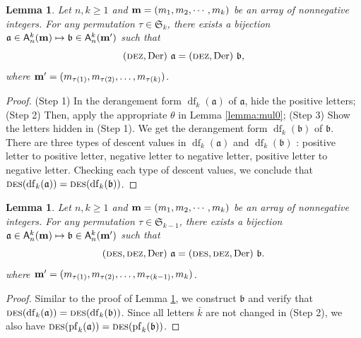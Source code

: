 \documentclass[12pt]{amsart} %
\numberwithin{equation}{section}
\theoremstyle{plain}
\newtheorem{lemma}[theorem]{Lemma}
\theoremstyle{definition}
\newcommand\A{\mathsf{A}}
\def\Der{\mathrm{Der}}
\def\DES{\hbox{\rm\textsc{des}}}
\def\DEZ{\hbox{\rm\textsc{dez}}}
\def\S{\mathfrak{S}}
\def\a{\mathfrak{a}}
\def\b{\mathfrak{b}}
\def\df{\operatorname{df}}
\def\pf{\operatorname{pf}}
\def\neg#1{{{{\bar#1}}}}
\begin{document}
\begin{lemma}\label{lemma:mul1}
Let $n,k\geq1$ and 
${\bf m}=(m_1, m_2, \cdots, m_k)$ be an array of nonnegative integers.
For any permutation $\tau\in \S_k$,
	there exists a bijection 
	$\a \in \A_n^k({\bf m}) \mapsto \b \in \A_n^k({\bf m'})$ such that 
\begin{equation}
(\DEZ,  \Der)~\a = (\DEZ,  \Der)~\b,
\end{equation}
where ${\bf m'} = (m_{\tau(1)}, m_{\tau(2)}, \ldots, m_{\tau(k)})$.
\end{lemma}
\begin{proof}
	(Step 1)	In the derangement form $\df_k(\a)$ of $\a$, hide the positive letters; (Step 2) Then, apply the appropriate $\theta$ in Lemma \ref{lemma:mul0}; (Step 3) Show the letters hidden in (Step 1). We get the derangement form 
	$\df_k(\b)$ of $\b$. 
	There are three types of descent values in $\df_k(\a)$ and $\df_k(\b)$ : positive letter to positive letter, negative letter to negative letter, positive letter to negative letter. Checking each type of descent values, we conclude that $\DES(\df_k(\a))=\DES(\df_k(\b))$.
\end{proof}
%
\begin{lemma}\label{lemma:mul2}
Let $n,k\geq1$ and 
${\bf m}=(m_1, m_2, \cdots, m_k)$ be an array of nonnegative integers.
	For any permutation $\tau\in \S_{k-1}$,
	there exists a bijection $\a\in \A_n^k({\bf m}) \mapsto \b\in \A_n^k({\bf m'})$ such that 
\begin{equation}
(\DES, \DEZ, \Der)~\a = (\DES, \DEZ, \Der)~\b.
\end{equation}
	where ${\bf m'} = (m_{\tau(1)}, m_{\tau(2)}, \ldots, m_{\tau(k-1)}, m_k)$.
\end{lemma}
\begin{proof}
	Similar to the proof of Lemma \ref{lemma:mul1}, we construct $\b$ and verify that $\DES(\df_k(\a))=\DES(\df_k(\b))$. 
	Since all letters $\neg k$ are not changed in (Step 2), we also have $\DES(\pf_k(\a))=\DES(\pf_k(\b))$.
\end{proof}
\end{document}
